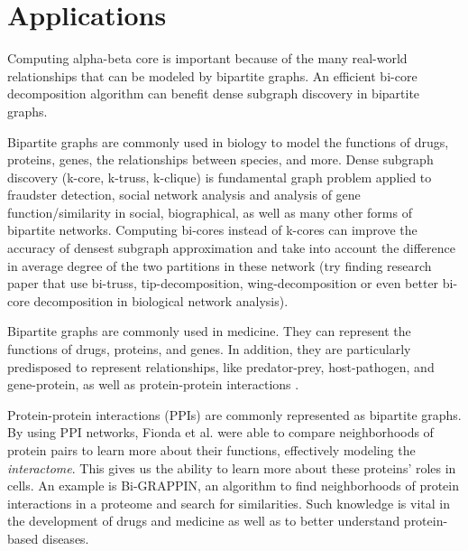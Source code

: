 \section{Applications}
Computing alpha-beta core is important because of the many real-world relationships that can be modeled by bipartite graphs. An efficient bi-core decomposition algorithm can benefit dense subgraph discovery in bipartite graphs. 

Bipartite graphs are commonly used in biology to model the functions of drugs, proteins, genes, the relationships between species, and more. Dense subgraph discovery (k-core, k-truss, k-clique) is fundamental graph problem applied to fraudster detection, social network analysis and analysis of gene function/similarity in social, biographical, as well as many other forms of bipartite networks.  Computing bi-cores instead of k-cores can improve the accuracy of densest subgraph approximation and take into account the difference in average degree of the two partitions in these network (try finding research paper that use bi-truss, tip-decomposition, wing-decomposition or even better bi-core decomposition in biological network analysis). 

Bipartite graphs are commonly used in medicine. They can represent the functions of drugs, proteins, and genes. In addition, they are particularly predisposed to represent relationships, like predator-prey, host-pathogen, and gene-protein, as well as protein-protein interactions  \cite{Algarra2013}.

Protein-protein interactions (PPIs) are commonly represented as bipartite graphs. By using PPI networks, Fionda et al. \cite{Fionda2007} were able to compare neighborhoods of protein pairs to learn more about their functions, effectively modeling the \textit{interactome}. This gives us the ability to learn more about these proteins' roles in cells. An example is Bi-GRAPPIN, an algorithm to find neighborhoods of protein interactions in a proteome and search for similarities. Such knowledge is vital in the development of drugs and medicine as well as to better understand protein-based diseases.

